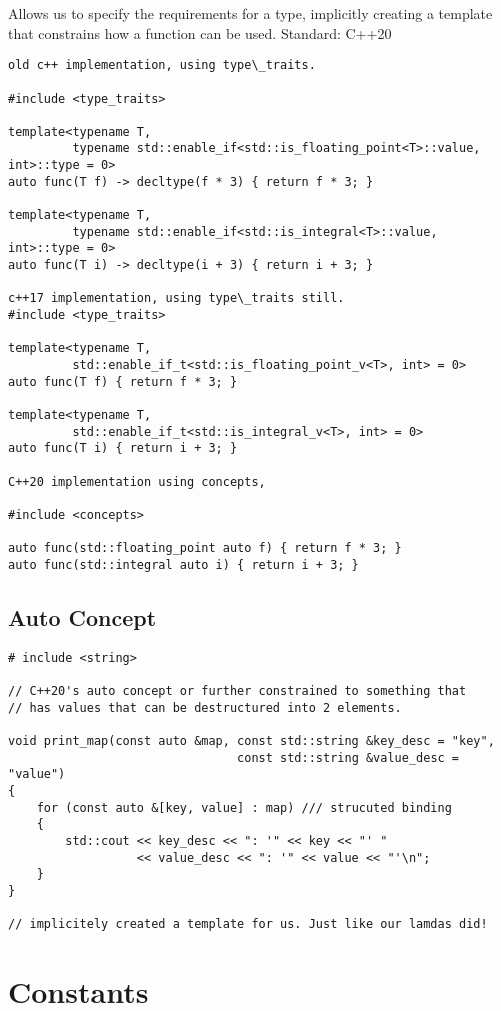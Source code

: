 \documentclass[openany]{report}
\begin{document}
Allows us to specify the requirements for a type, implicitly creating a template
that constrains how a function can be used. Standard: C++20

\begin{verbatim}
old c++ implementation, using type\_traits.

#include <type_traits>

template<typename T,
         typename std::enable_if<std::is_floating_point<T>::value, int>::type = 0>
auto func(T f) -> decltype(f * 3) { return f * 3; }

template<typename T,
         typename std::enable_if<std::is_integral<T>::value, int>::type = 0>
auto func(T i) -> decltype(i + 3) { return i + 3; }

c++17 implementation, using type\_traits still.
#include <type_traits>

template<typename T,
         std::enable_if_t<std::is_floating_point_v<T>, int> = 0>
auto func(T f) { return f * 3; }

template<typename T,
         std::enable_if_t<std::is_integral_v<T>, int> = 0>
auto func(T i) { return i + 3; }

C++20 implementation using concepts, 

#include <concepts>

auto func(std::floating_point auto f) { return f * 3; }
auto func(std::integral auto i) { return i + 3; }
\end{verbatim}

\subsection{Auto Concept}

\begin{verbatim}
# include <string>

// C++20's auto concept or further constrained to something that
// has values that can be destructured into 2 elements.

void print_map(const auto &map, const std::string &key_desc = "key",
                                const std::string &value_desc = "value")
{
    for (const auto &[key, value] : map) /// strucuted binding
    {
        std::cout << key_desc << ": '" << key << "' "
                  << value_desc << ": '" << value << "'\n";
    }
}

// implicitely created a template for us. Just like our lamdas did!
\end{verbatim}

\section{Constants}
\end{document}
